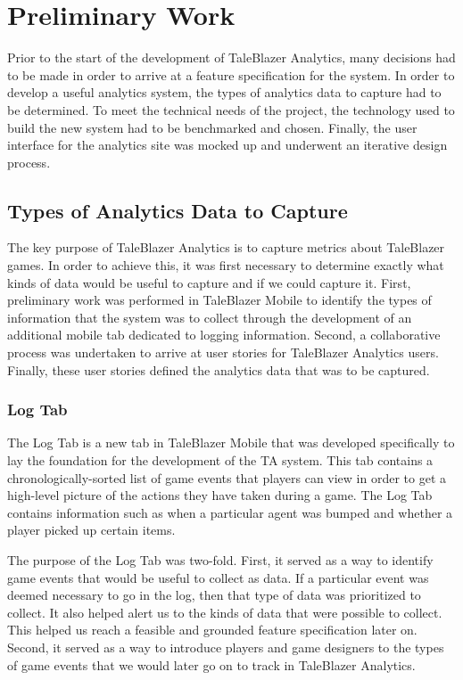 \chapter{Preliminary Work}

Prior to the start of the development of TaleBlazer Analytics, many decisions had to be made in order to arrive at a feature specification for the system. In order to develop a useful analytics system, the types of analytics data to capture had to be determined. To meet the technical needs of the project, the technology used to build the new system had to be benchmarked and chosen. Finally, the user interface for the analytics site was mocked up and underwent an iterative design process.

\section{Types of Analytics Data to Capture}

The key purpose of TaleBlazer Analytics is to capture metrics about TaleBlazer games. In order to achieve this, it was first necessary to determine exactly what kinds of data would be useful to capture and if we could capture it. First, preliminary work was performed in TaleBlazer Mobile to identify the types of information that the system was to collect through the development of an additional mobile tab dedicated to logging information. Second, a collaborative process was undertaken to arrive at user stories for TaleBlazer Analytics users. Finally, these user stories defined the analytics data that was to be captured. 

\subsection{Log Tab}

The Log Tab is a new tab in TaleBlazer Mobile that was developed specifically to lay the foundation for the development of the TA system. This tab contains a chronologically-sorted list of game events that players can view in order to get a high-level picture of the actions they have taken during a game. The Log Tab contains information such as when a particular agent was bumped and whether a player picked up certain items. 

The purpose of the Log Tab was two-fold. First, it served as a way to identify game events that would be useful to collect as data. If a particular event was deemed necessary to go in the log, then that type of data was prioritized to collect. It also helped alert us to the kinds of data that were possible to collect. This helped us reach a feasible and grounded feature specification later on. Second, it served as a way to introduce players and game designers to the types of game events that we would later go on to track in TaleBlazer Analytics.

